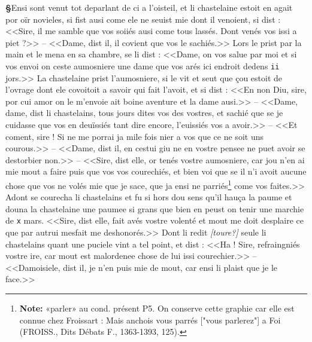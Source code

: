 \documentclass[12pt]{article} %
\newcommand{\num}[1]{\texttt{#1}}    %
\newcommand{\supplied}[1]{\textlangle#1\textrangle} %
\newcommand{\uncertain}[1]{\textit{[#1?]}} %
\newcommand{\fnnote}[1]{\footnote{\textbf{Note:} #1}} %
\newcounter{paranum}
\newcommand{\pnum}{\stepcounter{paranum}\textbf{§\arabic{paranum}}\quad}
\begin{document}
\pnum Ensi sont venut tot deparlant de ci a l'oisteil, et li chastelaine estoit en agait por oïr novieles, si fist ausi come ele ne seuist mie dont il venoient, si dist : <<Sire, il me samble que vos soiiés ausi come tous lassés. Dont venés vos issi a piet ?>> -- <<Dame, dist il, il covient que vos le sachiés.>> Lors le prist par la main et le mena en sa chambre, se li dist : <<Dame, on vos salue par moi et si vos envoi on ceste aumosniere une dame que vos arés ici endroit dedens \num{ii} jors.>> La chastelaine prist l'aumosniere, si le vit et seut que çou estoit de l'ovrage dont ele covoitoit a savoir qui fait l'avoit, et si dist : <<En non Diu, sire, por cui amor on le m'envoie ait boine aventure et la dame ausi.>> -- <<Dame, dame, dist li chastelains, tous jours dites vos des vostres, et sachié que se je cuidasse que vos en deuïssiés tant dire encore, l'euissiés vos a avoir.>> -- <<Et coment, sire ! Si ne me porrai ja mile fois nier a vos que ce ne soit uns courous.>> -- <<Dame, dist il, en cestui giu ne en vostre pensee ne puet avoir se destorbier non.>> -- <<Sire, dist elle, or tenés v\supplied{ost}re aumosniere, car jou n'en ai mie mout a faire puis que vos vos courechiés, et bien voi que se il n'i avoit aucune chose que vos ne volés mie que je sace, que ja ensi ne parriés\fnnote{«parler» au cond. présent P5. On conserve cette graphie car elle est connue chez Froissart : Mais anchois vous parrés ["vous parlerez"] a Foi (FROISS., Dits Débats F., 1363-1393, 125).} come vos faites.>> Adont se courecha li chastelains et fu si hors dou sens qu'il hauça la paume et douna la chastelaine une paumee si grans que bien en peust on tenir une marchie de \num{x} mars. <<Sire, dist elle, fait avés vostre volenté et mout me doit desplaire ce que par autrui mesfait me deshonorés.>> Dont li redit \uncertain{toure} seule li chastelains quant une puciele vint a tel point, et dist : <<Ha ! Sire, refraingniés vostre ire, car mout est malordenee chose de lui issi courechier.>> -- <<Damoisiele, dist il, je n'en puis mie de mout, car ensi li plaist que je le face.>>
\end{document}
